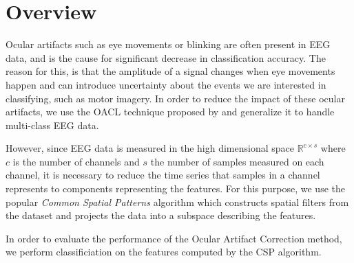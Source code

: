 \section{Overview}
Ocular artifacts such as eye movements or blinking are often present in EEG data, and is the cause for significant decrease in classification accuracy. The reason for this, is that the amplitude of a signal changes when eye movements happen and can introduce uncertainty about the events we are interested in classifying, such as motor imagery. In order to reduce the impact of these ocular artifacts, we use the OACL technique proposed by \citet{li2015ocular} and generalize it to handle multi-class EEG data.

However, since EEG data is measured in the high dimensional space $\mathbb{R}^{c \times s}$ where $c$ is the number of channels and $s$ the number of samples measured on each channel, it is necessary to reduce the time series that samples in a channel represents to components representing the features. For this purpose, we use the popular \emph{Common Spatial Patterns} algorithm which constructs spatial filters from the dataset and projects the data into a subspace describing the features.

In order to evaluate the performance of the Ocular Artifact Correction method, we perform classificiation on the features computed by the CSP algorithm.
